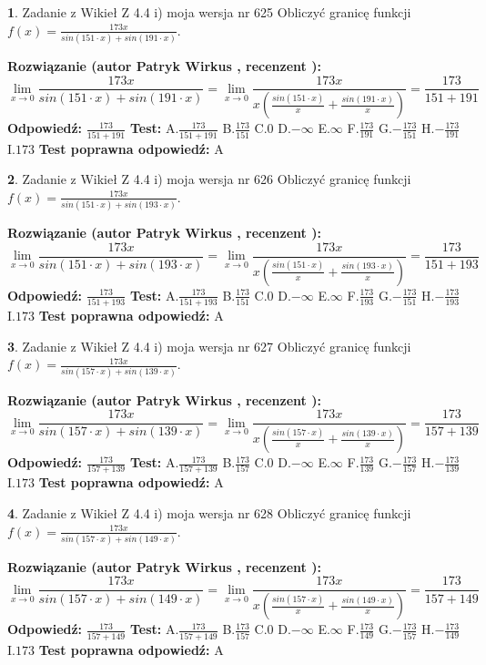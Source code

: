 \documentclass[12pt, a4paper]{article}
\theoremstyle{definition} %
\newtheorem{zad}{}
\newcommand{\zadStart}[1]{\begin{zad}#1\newline}
\newcommand{\zadStop}{\end{zad}}
\newcommand{\rozwStart}[2]{\noindent \textbf{Rozwiązanie (autor #1 , recenzent #2): }\newline}
\newcommand{\rozwStop}{\newline}
\newcommand{\odpStart}{\noindent \textbf{Odpowiedź:}\newline}
\newcommand{\odpStop}{\newline}
\newcommand{\testStart}{\noindent \textbf{Test:}\newline}
\newcommand{\testStop}{\newline}
\newcommand{\kluczStart}{\noindent \textbf{Test poprawna odpowiedź:}\newline}
\newcommand{\kluczStop}{\newline}
\begin{document}
\zadStart{Zadanie z Wikieł Z 4.4 i) moja wersja nr 625}
Obliczyć granicę funkcji $f(x)=\frac{173x}{sin(151\cdot x) +sin(191\cdot x)}$.
\zadStop
\rozwStart{Patryk Wirkus}{}
$$\lim\limits_{x\to 0}\frac{173x}{sin(151\cdot x) +sin(191\cdot x)}=\lim\limits_{x\to 0}\frac{173x}{x(\frac{sin(151\cdot x)}{x}+\frac{sin(191\cdot x)}{x})}=\frac{173}{151+191}$$
\rozwStop
\odpStart
$\frac{173}{151+191}$
\odpStop
\testStart
A.$\frac{173}{151+191}$
B.$\frac{173}{151}$
C.$0$
D.$-\infty$
E.$\infty$
F.$\frac{173}{191}$
G.$-\frac{173}{151}$
H.$-\frac{173}{191}$
I.$173$
\testStop
\kluczStart
A
\kluczStop



\zadStart{Zadanie z Wikieł Z 4.4 i) moja wersja nr 626}
Obliczyć granicę funkcji $f(x)=\frac{173x}{sin(151\cdot x) +sin(193\cdot x)}$.
\zadStop
\rozwStart{Patryk Wirkus}{}
$$\lim\limits_{x\to 0}\frac{173x}{sin(151\cdot x) +sin(193\cdot x)}=\lim\limits_{x\to 0}\frac{173x}{x(\frac{sin(151\cdot x)}{x}+\frac{sin(193\cdot x)}{x})}=\frac{173}{151+193}$$
\rozwStop
\odpStart
$\frac{173}{151+193}$
\odpStop
\testStart
A.$\frac{173}{151+193}$
B.$\frac{173}{151}$
C.$0$
D.$-\infty$
E.$\infty$
F.$\frac{173}{193}$
G.$-\frac{173}{151}$
H.$-\frac{173}{193}$
I.$173$
\testStop
\kluczStart
A
\kluczStop



\zadStart{Zadanie z Wikieł Z 4.4 i) moja wersja nr 627}
Obliczyć granicę funkcji $f(x)=\frac{173x}{sin(157\cdot x) +sin(139\cdot x)}$.
\zadStop
\rozwStart{Patryk Wirkus}{}
$$\lim\limits_{x\to 0}\frac{173x}{sin(157\cdot x) +sin(139\cdot x)}=\lim\limits_{x\to 0}\frac{173x}{x(\frac{sin(157\cdot x)}{x}+\frac{sin(139\cdot x)}{x})}=\frac{173}{157+139}$$
\rozwStop
\odpStart
$\frac{173}{157+139}$
\odpStop
\testStart
A.$\frac{173}{157+139}$
B.$\frac{173}{157}$
C.$0$
D.$-\infty$
E.$\infty$
F.$\frac{173}{139}$
G.$-\frac{173}{157}$
H.$-\frac{173}{139}$
I.$173$
\testStop
\kluczStart
A
\kluczStop



\zadStart{Zadanie z Wikieł Z 4.4 i) moja wersja nr 628}
Obliczyć granicę funkcji $f(x)=\frac{173x}{sin(157\cdot x) +sin(149\cdot x)}$.
\zadStop
\rozwStart{Patryk Wirkus}{}
$$\lim\limits_{x\to 0}\frac{173x}{sin(157\cdot x) +sin(149\cdot x)}=\lim\limits_{x\to 0}\frac{173x}{x(\frac{sin(157\cdot x)}{x}+\frac{sin(149\cdot x)}{x})}=\frac{173}{157+149}$$
\rozwStop
\odpStart
$\frac{173}{157+149}$
\odpStop
\testStart
A.$\frac{173}{157+149}$
B.$\frac{173}{157}$
C.$0$
D.$-\infty$
E.$\infty$
F.$\frac{173}{149}$
G.$-\frac{173}{157}$
H.$-\frac{173}{149}$
I.$173$
\testStop
\kluczStart
A
\kluczStop
\end{document}
